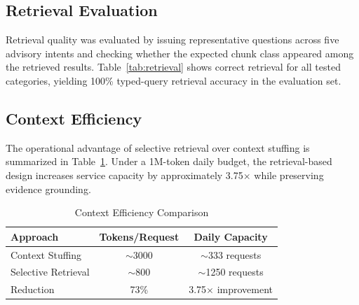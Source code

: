\documentclass{article}
\begin{document}
\subsection{Retrieval Evaluation}
Retrieval quality was evaluated by issuing representative questions across five advisory intents and checking whether the expected chunk class appeared among the retrieved results. Table~\ref{tab:retrieval} shows correct retrieval for all tested categories, yielding 100\% typed-query retrieval accuracy in the evaluation set.

\begin{table}[t]
\caption{Retrieval Evaluation}
\label{tab:retrieval}
\centering
{}
\end{table}

\subsection{Context Efficiency}
The operational advantage of selective retrieval over context stuffing is summarized in Table~\ref{tab:tokens}. Under a 1M-token daily budget, the retrieval-based design increases service capacity by approximately 3.75$\times$ while preserving evidence grounding.

\begin{table}[t]
\caption{Context Efficiency Comparison}
\label{tab:tokens}
\centering
\begin{tabular}{lcc}
\toprule
Approach & Tokens/Request & Daily Capacity \\
\midrule
Context Stuffing & $\sim$3000 & $\sim$333 requests \\
Selective Retrieval & $\sim$800 & $\sim$1250 requests \\
Reduction & 73\% & 3.75$\times$ improvement \\
\bottomrule
\end{tabular}
\end{table}
\end{document}
